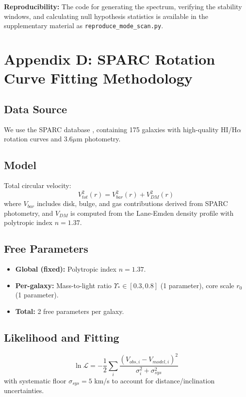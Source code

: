 \documentclass[a4paper,12pt]{article}
\begin{document}
\textbf{Reproducibility:} The code for generating the spectrum, verifying the stability windows, and calculating null hypothesis statistics is available in the supplementary material as \texttt{reproduce\_mode\_scan.py}.



\newpage
\section{Appendix D: SPARC Rotation Curve Fitting Methodology}

\subsection{Data Source}
We use the SPARC database \cite{lelli}, containing 175 galaxies with high-quality HI/H$\alpha$ rotation curves and 3.6$\mu$m photometry.

\subsection{Model}
Total circular velocity:
\begin{equation}
V_{tot}^2(r) = V_{bar}^2(r) + V_{DM}^2(r)
\end{equation}
where $V_{bar}$ includes disk, bulge, and gas contributions derived from SPARC photometry, and $V_{DM}$ is computed from the Lane-Emden density profile with polytropic index $n = 1.37$.

\subsection{Free Parameters}
\begin{itemize}
\item \textbf{Global (fixed):} Polytropic index $n = 1.37$.
\item \textbf{Per-galaxy:} Mass-to-light ratio $\Upsilon_* \in [0.3, 0.8]$ (1 parameter), core scale $r_0$ (1 parameter).
\item \textbf{Total:} 2 free parameters per galaxy.
\end{itemize}

\subsection{Likelihood and Fitting}
\begin{equation}
\ln \mathcal{L} = -\frac{1}{2} \sum_i \frac{(V_{obs,i} - V_{model,i})^2}{\sigma_i^2 + \sigma_{sys}^2}
\end{equation}
with systematic floor $\sigma_{sys} = 5$ km/s to account for distance/inclination uncertainties.
\end{document}
